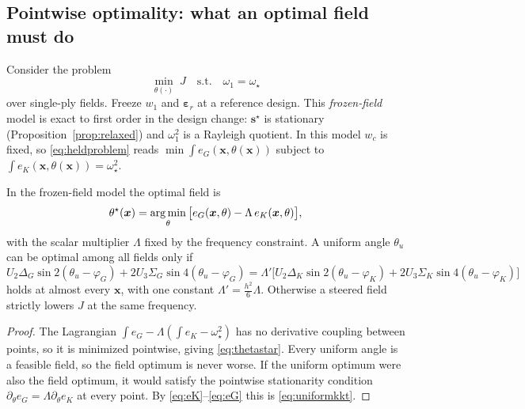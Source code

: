\subsection{Pointwise optimality: what an optimal field must do}\label{sec:pointwise}
Consider the problem
\begin{equation}
\min_{\theta(\cdot)}\;J\quad\text{s.t.}\quad\omega_1=\omega_\star
\label{eq:heldproblem}
\end{equation}
over single-ply fields. Freeze $w_1$ and $\bm\varepsilon_r$ at a reference design. This
\emph{frozen-field} model is exact to first order in the design change: $\bm
s^\star$ is stationary (Proposition~\ref{prop:relaxed}) and $\omega_1^2$ is a Rayleigh
quotient. In this model $w_c$ is fixed, so \eqref{eq:heldproblem} reads
$\min\int e_G(\bm x,\theta(\bm x))$ subject to $\int e_K(\bm x,\theta(\bm x))=\omega_\star^2$.

\begin{proposition}\label{prop:pointwise}
In the frozen-field model the optimal field is
\begin{equation}
\theta^\star(\bm x)=\operatorname*{arg\,min}_\theta\big[e_G(\bm x,\theta)-\Lambda\,e_K(\bm x,\theta)\big],
\label{eq:thetastar}
\end{equation}
with the scalar multiplier $\Lambda$ fixed by the frequency constraint. A uniform angle
$\theta_u$ can be optimal among all fields only if
\begin{equation}
U_2\Delta_G\sin2(\theta_u-\varphi_G)+2U_3\Sigma_G\sin4(\theta_u-\varphi_G)
=\Lambda'\big[U_2\Delta_K\sin2(\theta_u-\varphi_K)+2U_3\Sigma_K\sin4(\theta_u-\varphi_K)\big]
\label{eq:uniformkkt}
\end{equation}
holds at almost every $\bm x$, with one constant $\Lambda'=\tfrac{h^2}{6}\Lambda$.
Otherwise a steered field strictly lowers $J$ at the same frequency.
\end{proposition}
\begin{proof}
The Lagrangian $\int e_G-\Lambda(\int e_K-\omega_\star^2)$ has no derivative coupling
between points, so it is minimized pointwise, giving \eqref{eq:thetastar}. Every
uniform angle is a feasible field, so the field optimum is never worse. If the uniform
optimum were also the field optimum, it would satisfy the pointwise stationarity
condition $\partial_\theta e_G=\Lambda\partial_\theta e_K$ at every point. By
\eqref{eq:eK}--\eqref{eq:eG} this is \eqref{eq:uniformkkt}.
\end{proof}

